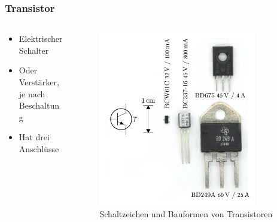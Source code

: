 \begin{frame}
\end{frame}

\begin{frame}
\frametitle{Transistor}
\begin{columns}
    \begin{column}{0.48\textwidth}
    \begin{itemize}
  \item Elektrischer Schalter
  \item Oder Verstärker, je nach Beschaltung
  \item Hat drei Anschlüsse
  \end{itemize}

    \end{column}
   \begin{column}{0.48\textwidth}
       
\begin{figure}
    \includegraphics[width=0.85\textwidth]{foto/208}
    \caption{\scriptsize Schaltzeichen und Bauformen von Transistoren}
    \label{n_bauelemente_transistor}
\end{figure}

   \end{column}
\end{columns}

\end{frame}

